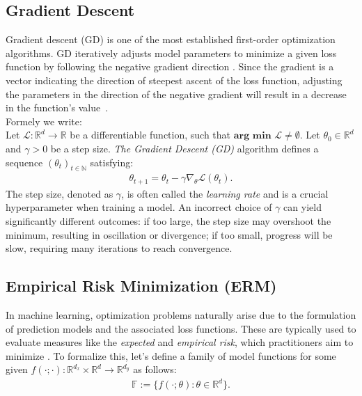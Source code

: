 \subsection{Gradient Descent}
Gradient descent (GD) is one of the most established first-order optimization algorithms. GD iteratively adjusts model
parameters to minimize a given loss function by following the negative gradient direction \cite{toussain2014gradient}.
Since the gradient is a vector indicating the direction of steepest ascent of the loss function, adjusting the parameters in the direction
of the negative gradient will result in a decrease in the function's value~\cite{toussain2014gradient}.\\
Formely we write:\\
\noindent
Let \( \mathcal{L} : \mathbb{R}^d \to \mathbb{R} \) be a differentiable function, such that \(\textbf{arg min } \mathcal{L}  \neq \emptyset \).  
Let \( \theta_0 \in \mathbb{R}^d \) and \( \gamma > 0 \) be a step size.  
\emph{The Gradient Descent (GD)} algorithm defines a sequence \( (\theta_t)_{t \in \mathbb{N}} \) satisfying:
\begin{align}
\theta_{t+1} = \theta_t - \gamma \nabla_{\theta} \mathcal{L}(\theta_t).
\end{align}
The step size, denoted as $\gamma$, is often called the \emph{learning rate} and is a crucial hyperparameter when training a model.
An incorrect choice of $\gamma$ can yield significantly different outcomes: if too large, the step size may overshoot the minimum, resulting in oscillation or divergence;
if too small, progress will be slow, requiring many iterations to reach convergence. \cite{wu2020wngrad} 


\subsection{Empirical Risk Minimization (ERM) \cite{bottou2018optimization}}
\label{sec:erm}

In machine learning, optimization problems naturally arise due to the formulation of prediction models and the associated loss functions.
These are typically used to evaluate measures like the \emph{expected} and \emph{empirical risk}, which practitioners aim to minimize \cite{bottou2018optimization}.
To formalize this, let's define a family of model functions for some given \( f(\cdot; \cdot) : \mathbb{R}^{d_x} \times \mathbb{R}^d \to \mathbb{R}^{d_y} \) as follows:
\begin{align}
\mathbb{F} := \{ f(\cdot; \theta) : \theta \in \mathbb{R}^d \}.
\end{align}

